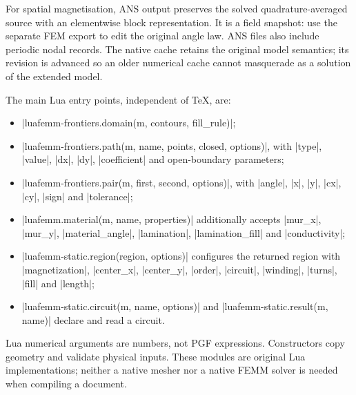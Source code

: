 For spatial magnetisation, ANS output preserves the solved quadrature-averaged
source with an elementwise block representation. It is a field snapshot: use
the separate FEM export to edit the original angle law. ANS files also include
periodic nodal records. The native cache retains the original model semantics;
its revision is advanced so an older numerical cache cannot masquerade as a
solution of the extended model.

The main Lua entry points, independent of TeX, are:
\begin{itemize}
\item |luafemm-frontiers.domain(m, contours, fill_rule)|;
\item |luafemm-frontiers.path(m, name, points, closed, options)|, with
  |type|, |value|, |dx|, |dy|, |coefficient| and open-boundary parameters;
\item |luafemm-frontiers.pair(m, first, second, options)|, with
  |angle|, |x|, |y|, |cx|, |cy|, |sign| and |tolerance|;
\item |luafemm.material(m, name, properties)| additionally accepts
  |mur_x|, |mur_y|, |material_angle|, |lamination|, |lamination_fill| and
  |conductivity|;
\item |luafemm-static.region(region, options)| configures the returned region
  with |magnetization|, |center_x|, |center_y|, |order|, |circuit|, |winding|,
  |turns|, |fill| and |length|;
\item |luafemm-static.circuit(m, name, options)| and
  |luafemm-static.result(m, name)| declare and read a circuit.
\end{itemize}
Lua numerical arguments are numbers, not PGF expressions. Constructors copy
geometry and validate physical inputs. These modules are original Lua
implementations; neither a native mesher nor a native FEMM solver is needed
when compiling a document.
